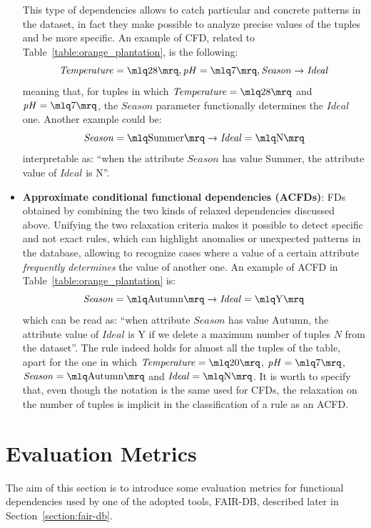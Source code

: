 \begin{itemize}
This type of dependencies allows to catch particular and concrete patterns in the dataset, in fact they make possible to analyze precise values of the tuples and be more specific. An example of CFD, related to Table~\ref{table:orange_plantation}, is the following: \[\mathit{Temperature} = \mlq 28 \mrq, \mathit{pH} = \mlq 7 \mrq, \mathit{Season} \rightarrow \mathit{Ideal}\] meaning that, for tuples in which \(\mathit{Temperature} = \mlq 28 \mrq\) and \(\mathit{pH} = \mlq 7 \mrq\), the \(\mathit{Season}\) parameter functionally determines the \(\mathit{Ideal}\) one. Another example could be: \[\mathit{Season} = \mlq \mathrm{Summer} \mrq \rightarrow \mathit{Ideal} = \mlq \mathrm{N} \mrq\] interpretable as: ``when the attribute \(\mathit{Season}\) has value \(\mathrm{Summer}\), the attribute value of \(\mathit{Ideal}\) is \(\mathrm{N}\)''.
\item \textbf{Approximate conditional functional dependencies (ACFDs)}: FDs obtained by combining the two kinds of relaxed dependencies discussed above. Unifying the two relaxation criteria makes it possible to detect specific and not exact rules, which can highlight anomalies or unexpected patterns in the database, allowing to recognize cases where a value of a certain attribute \textit{frequently determines} the value of another one. An example of ACFD in Table~\ref{table:orange_plantation} is: \[\mathit{Season} = \mlq \mathrm{Autumn} \mrq \rightarrow \mathit{Ideal} = \mlq \mathrm{Y} \mrq\] which can be read as: ``when attribute \(\mathit{Season}\) has value \(\mathrm{Autumn}\), the attribute value of \(\mathit{Ideal}\) is \(\mathrm{Y}\) if we delete a maximum number of tuples \(N\) from the dataset''. The rule indeed holds for almost all the tuples of the table, apart for the one in which \(\mathit{Temperature} = \mlq 20 \mrq\), \(\mathit{pH} = \mlq 7 \mrq\), \(\mathit{Season} = \mlq \mathrm{Autumn} \mrq\) and \(\mathit{Ideal} = \mlq \mathrm{N} \mrq\). It is worth to specify that, even though the notation is the same used for CFDs, the relaxation on the number of tuples is implicit in the classification of a rule as an ACFD.
\end{itemize}


\section{Evaluation Metrics}
\label{section:evaluation_metrics}
The aim of this section is to introduce some evaluation metrics for functional dependencies used by one of the adopted tools, FAIR-DB, described later in Section~\ref{section:fair-db}.


